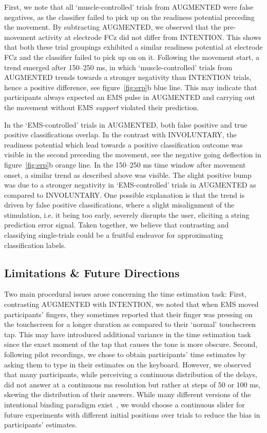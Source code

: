 First, we note that all `muscle-controlled' trials from AUGMENTED were false negatives, as the classifier failed to pick up on the readiness potential preceding the movement. By subtracting AUGMENTED, we observed that the pre-movement activity at electrode FCz did not differ from INTENTION. This shows that both these trial groupings exhibited a similar readiness potential at electrode FCz and the classifier failed to pick up on on it. Following the movement start, a trend emerged after 150--250 ms, in which `muscle-controlled' trials from AUGMENTED trends towards a stronger negativity than INTENTION trials, hence a positive difference, see figure~\ref{fig:erp}b blue line. This may indicate that participants always expected an EMS pulse in AUGMENTED and carrying out the movement without EMS \textit{support} violated their prediction. 

In the `EMS-controlled' trials in AUGMENTED, both false positive and true positive classifications overlap. In the contrast with INVOLUNTARY, the readiness potential which lead towards a positive classification outcome was visible in the second preceding the movement, see the negative going deflection in figure~\ref{fig:erp}b orange line. In the 150--250 ms time window after movement onset, a similar trend as described above was visible. The slight positive bump was due to a stronger negativity in `EMS-controlled' trials in AUGMENTED as compared to INVOLUNTARY. One possible explanation is that the trend is driven by false positive classifications, where a slight misalignment of the stimulation, i.e. it being too early, severely disrupts the user, eliciting a string prediction error signal. Taken together, we believe that contrasting and classifying single-trials could be a fruitful endeavor for approximating classification labels.

\subsection{Limitations \& Future Directions}
Two main procedural issues arose concerning the time estimation task: First, contrasting AUGMENTED with INTENTION, we noted that when EMS moved participants' fingers, they sometimes reported that their finger was pressing on the touchscreen for a longer duration as compared to their `normal' touchscreen tap. This may have introduced additional variance in the time estimation task since the exact moment of the tap that causes the tone is more obscure. Second, following pilot recordings, we chose to obtain participants' time estimates by asking them to type in their estimates on the keyboard. However, we observed that many participants, while perceiving a continuous distribution of the delays, did not answer at a continuous ms resolution but rather at steps of 50 or 100 ms, skewing the distribution of their answers. While many different versions of the intentional binding paradigm exist~\cite{Moore2012-dk}, we would choose a continuous slider for future experiments with different initial positions over trials to reduce the bias in participants' estimates.

